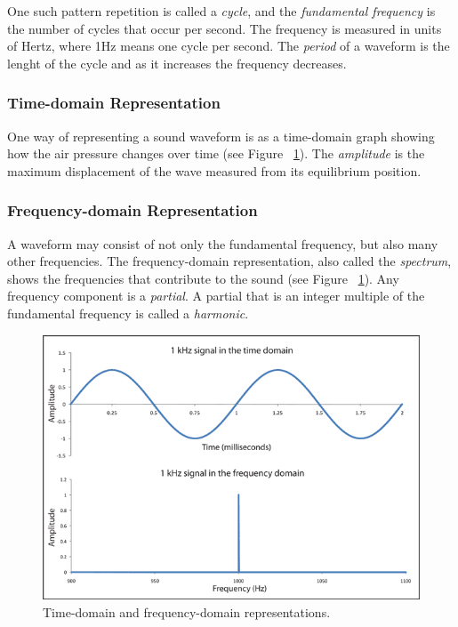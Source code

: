 \documentclass[11pt]{article} %
\begin{document}
One such pattern repetition is called a \textit{cycle}, and the \textit{fundamental frequency} is the number of cycles that occur per second. The frequency is measured in units of Hertz, where 1Hz means one cycle per second. The \textit{period} of a waveform is the lenght of the cycle and as it increases the frequency decreases.

\subsubsection{Time-domain Representation}
One way of representing a sound waveform is as a time-domain graph showing how the air pressure changes over time (see Figure ~\ref{fig:representations}). The \textit{amplitude} is the maximum displacement of the wave measured from its equilibrium position.

\subsubsection{Frequency-domain Representation}
A waveform may consist of not only the fundamental frequency, but also many other frequencies. The frequency-domain representation, also called the \textit{spectrum}, shows the frequencies that contribute to the sound (see Figure ~\ref{fig:representations}). Any frequency component is a \textit{partial}. A partial that is an integer multiple of the fundamental frequency is called a \textit{harmonic}.

\begin{figure}[h!]
\begin{center}
\includegraphics[scale=0.6]{TimeDomain}
\end{center}
\caption{Time-domain and frequency-domain representations.}
\label{fig:representations}
\end{figure}
\end{document}
